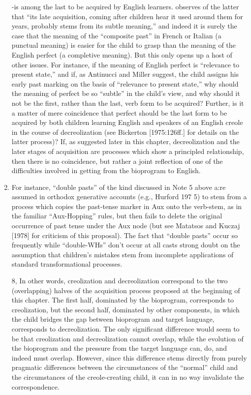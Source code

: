 \begin{enumerate}
{}-is among the last to be acquired by English learners. \citet{Maratsos1979} observes of the latter that ``its late acquisition, coming after children hear it used around them for years, probably stems from its subtle meaning,'' and indeed it is surely the case that the meaning of the ``composite past'' in French or Italian (a punctual meaning) is easier for the child to grasp than the meaning of the English perfect (a com\-pletive meaning). But this only opens up a host of other issues. For instance, if the meaning of English perfect is ``relevance to present state,'' and if, as Antinucci and Miller suggest, the child assigns his early past marking on the basis of ``relevance to present state,'' why should the meaning of perfect be so ``subtle'' in the child's view, and why should it not be the first, rather than the last, verb form to be acquired? Further, is it a matter of mere coincidence that perfect should be the last form to be acquired by both children learning English and speakers of an English creole in the course of decreolization (see Bickerton [1975:126ff.] for details on the latter process)? If, as suggested later in this chapter, decreolization and the later stages of acquisition are processes which show a principled relationship, then there is no coincidence, but rather a joint reflection of one of the difficulties involved in getting from the bioprogram to English.


\item For instance, ``double pasts'' of the kind discussed in Note 5 above a:re assumed in orthodox generative accounts (e.g., Hurford 197 5) to stem from a process which copies the past-tense marker in Aux onto the verb-stem, as in the familiar ``Aux-Hopping'' rules, but then fails to delete the original occurrence of past tense under the Aux node (but see Matatsos and Kuczaj [1978] for criticism of this proposal). The fact that ``double pasts'' occur so frequently while ``double-WHs'' don't occur at all casts strong doubt on the assumption that children's mistakes stem from incomplete applications of standard transformational processes. 

8, In other words, creolization and decreolization correspond to the two (overlapping) halves of the acquisition process proposed at the beginning of this chapter. The first half, dominated by the bio\-program, corresponds to creolization, but the second half, dominated by other components, in which the child bridges the gap between bioprogram and target language, corresponds to decreolization. The only significant difference would seem to be that creolization and decreolization cannot overlap, while the evolution of the bioprogram and the pressure from the target language can, do, and indeed must overlap. However, since this difference stems directly from purely pragmatic differences between the circumstances of the ``normal'' child and the circumstances of the creole-creating child, it can in no way invalidate the correspondence.
 

\end{enumerate}
